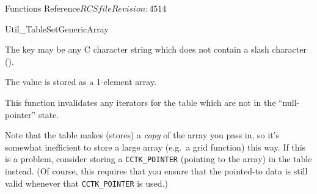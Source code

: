 \begin{cactuspart}{ Functions Reference}{$RCSfile$}{$Revision: 4514 $}
\begin{FunctionDescription}{Util\_TableSetGenericArray}
\begin{Discussion}
The key may be any C character string which does not contain a slash
character ().

The value is stored as a 1-element array.

This function invalidates any iterators for the table which are
not in the ``null-pointer'' state.

Note that the table makes (stores) a \emph{copy} of the array
you pass in, so it's somewhat inefficient to store a large array
(e.g.~a grid function) this way.  If this is a problem, consider
storing a \verb|CCTK_POINTER| (pointing to the array) in the table
instead.  (Of course, this requires that you ensure that the pointed-to
data is still valid whenever that \verb|CCTK_POINTER| is used.)
\end{Discussion}


\end{FunctionDescription}
\end{cactuspart}
